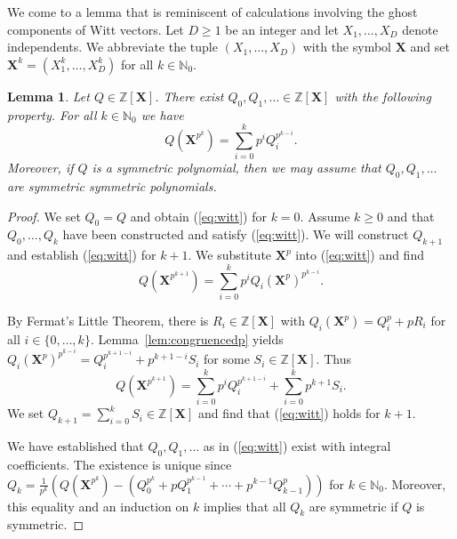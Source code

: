\documentclass[12pt,oneside,a4]{amsart}
\newcommand{\IN}{\mathbb{N}}
\newcommand{\IZ}{\mathbb{Z}}
\newcounter{maincounter}
\numberwithin{maincounter}{section}
\numberwithin{equation}{section}
\newtheorem{lemma}[maincounter]{Lemma}
\begin{document}
We come to a lemma that is reminiscent of calculations involving the ghost
components of Witt vectors. Let $D\ge 1$ be an integer and
let $X_1,\ldots,X_D$ denote independents.
We abbreviate the tuple $(X_1,\ldots,X_D)$ with the symbol
$\boldsymbol X$ and set ${\boldsymbol X}^k = (X_1^k,\ldots,X_D^k)$ for
all $k\in\IN_0$.

\begin{lemma}
  \label{lem:witt}
  Let $Q\in \IZ[{\boldsymbol X}]$. There
  exist $Q_0,Q_1,\ldots \in \IZ[{\boldsymbol X}]$ with the following
  property. For all $k\in \IN_0$ we have 
  \begin{equation}
    \label{eq:witt}
    Q({\boldsymbol X}^{p^k}) = \sum_{i=0}^k p^i Q_i^{p^{k-i}}.
  \end{equation}
  Moreover, if $Q$ is a symmetric polynomial, then we may assume
  that $Q_0,Q_1,\ldots$ are symmetric symmetric polynomials.
\end{lemma}
\begin{proof}
  We set $Q_0=Q$ and obtain (\ref{eq:witt}) for $k=0$.
  Assume $k\ge 0$ and that $Q_0,\ldots,Q_k$ have been constructed and satisfy
  (\ref{eq:witt}). We  will construct $Q_{k+1}$ and establish   (\ref{eq:witt})
  for $k+1$.
  We substitute ${\boldsymbol X}^p$ into (\ref{eq:witt}) and find 
  \begin{equation*}   
    Q({\boldsymbol X}^{p^{k+1}}) = \sum_{i=0}^k p^i Q_i({\boldsymbol X}^p)^{p^{k-i}}.
  \end{equation*}
  
  By Fermat's Little Theorem,  there is $R_i\in
  \IZ[{\boldsymbol X}]$ with $Q_i({\boldsymbol X}^p) = Q_i^p + pR_i$
  for all $i\in \{0,\ldots,k\}$.
  Lemma~\ref{lem:congruencedp} yields $Q_i({\boldsymbol X}^p)^{p^{k-i}} =
  Q_i^{p^{k+1-i}} + p^{k+1-i} S_{i}$ for some
  $S_{i}\in\IZ[{\boldsymbol X}]$. 
  Thus
  \begin{equation*}   
    Q({\boldsymbol X}^{p^{k+1}}) 
    = 
    \sum_{i=0}^k p^i Q_i^{p^{k+1-i}} + \sum_{i=0}^k p^{k+1}S_{i}.
  \end{equation*}
  We set $Q_{k+1} = \sum_{i=0}^k S_{i} \in \IZ[{\boldsymbol X}]$ and
  find that (\ref{eq:witt}) holds for $k+1$. 
  
  We have established that $Q_0,Q_1,\ldots$ as in (\ref{eq:witt})
  exist with integral coefficients. The
  existence is unique since 
  $Q_k = \frac{1}{p^k} (Q({\boldsymbol X}^{p^k})- (Q_0^{p^k}+ p
  Q_1^{p^{k-1}}+\cdots + p^{k-1} Q_{k-1}^p))$ for $k\in\IN_0$.
  Moreover, this equality and an induction on $k$ implies that all $Q_k$ are
  symmetric if $Q$ is symmetric. 
\end{proof}
\end{document}
